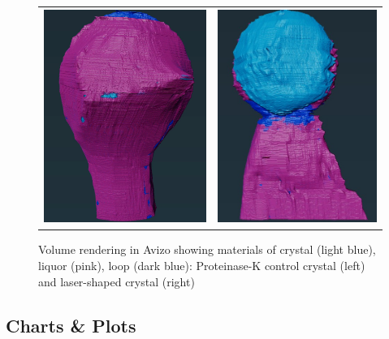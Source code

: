 \begin{figure}
    \begin{tabular}{cc}
	\includegraphics[height=7cm]{images/avizo_flats/prot_con.png} & \includegraphics[height=7cm]{images/avizo_flats/prot_ls.jpg}
    \end{tabular}
    \caption{Volume rendering in Avizo showing materials of crystal (light blue), liquor (pink), loop (dark blue): Proteinase-K control crystal (left) and laser-shaped crystal (right)}
    \label{avizo_proteinasek}
\end{figure}
\newpage

\subsection*{Charts \& Plots}

